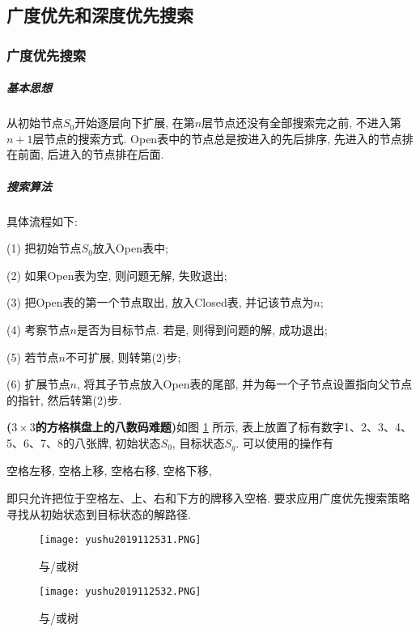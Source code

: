 \subsection{广度优先和深度优先搜索}
\subsubsection{广度优先搜索}
\subparagraph{基本思想}
    从初始节点$S_0$开始逐层向下扩展, 在第$n$层节点还没有全部搜索完之前, 不进入第$n+1$层节点的搜索方式. Open表中的节点总是按进入的先后排序, 先进入的节点排在前面, 后进入的节点排在后面.
\subparagraph{搜索算法} 具体流程如下:

\quad (1) 把初始节点$S_0$放入Open表中;

\quad (2) 如果Open表为空, 则问题无解, 失败退出;

\quad (3) 把Open表的第一个节点取出, 放入Closed表, 并记该节点为$n$;

\quad (4) 考察节点$n$是否为目标节点. 若是, 则得到问题的解, 成功退出;

\quad (5) 若节点$n$不可扩展, 则转第(2)步;

\quad (6) 扩展节点$n$, 将其子节点放入Open表的尾部, 并为每一个子节点设置指向父节点的指针, 然后转第(2)步.
\begin{example}
\textbf{($3\times 3$的方格棋盘上的八数码难题)}\quad 如图 \ref{AI32fig2019120231} 所示, 表上放置了标有数字1、2、3、4、5、6、7、8的八张牌, 初始状态$S_0$, 目标状态$S_g$. 可以使用的操作有
\begin{center}
    空格左移, 空格上移, 空格右移, 空格下移,
\end{center}
即只允许把位于空格左、上、右和下方的牌移入空格. 要求应用广度优先搜索策略寻找从初始状态到目标状态的解路径.
\end{example}
\begin{figure}[H]
    \vspace{-0.5cm}
    \centering
    \texttt{[image: yushu2019112531.PNG]}
    \caption{与/或树 }
    \label{AI32fig2019120231}
\end{figure}
\begin{figure}[H]
    \centering
    \texttt{[image: yushu2019112532.PNG]}
    \caption{与/或树 }
    \label{AI32fig32}
\end{figure}
